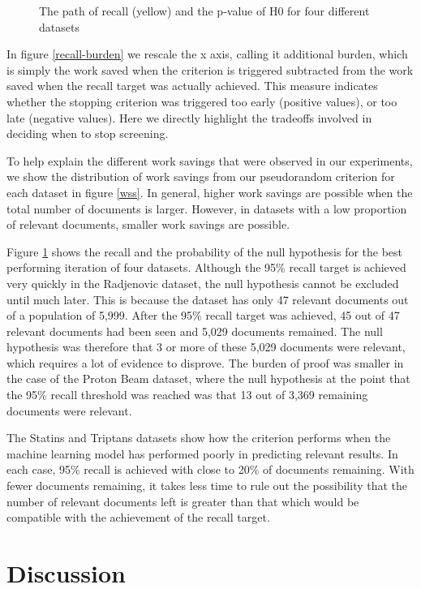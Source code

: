 \documentclass{bmcart}
\begin{document}
\begin{figure}
		\caption{\small The path of recall (yellow) and the p-value of H0 for four different datasets} 
		\label{H0paths}
	\end{figure}
	
	In figure \ref{recall-burden} we rescale the x axis, calling it additional burden, which is simply the work saved when the criterion is triggered subtracted from the work saved when the recall target was actually achieved. This measure indicates whether the stopping criterion was triggered too early (positive values), or too late (negative values). Here we directly highlight the tradeoffs involved in deciding when to stop screening. 
	
	To help explain the different work savings that were observed in our experiments, we show the distribution of work savings from our pseudorandom criterion for each dataset in figure \ref{wss}. In general, higher work savings are possible when the total number of documents is larger. However, in datasets with a low proportion of relevant documents, smaller work savings are possible. 
	
	Figure \ref{H0paths} shows the recall and the probability of the null hypothesis for the best performing iteration of four datasets. Although the 95\% recall target is achieved very quickly in the Radjenovic dataset, the null hypothesis cannot be excluded until much later. This is because the dataset has only 47 relevant documents out of a population of 5,999. After the 95\% recall target was achieved, 45 out of 47 relevant documents had been seen and 5,029 documents remained. The null hypothesis was therefore that 3 or more of these 5,029 documents were relevant, which requires a lot of evidence to disprove. The burden of proof was smaller in the case of the Proton Beam dataset, where the null hypothesis at the point that the 95\% recall threshold was reached was that 13 out of 3,369 remaining documents were relevant. 
	
	The Statins and Triptans datasets show how the criterion performs when the machine learning model has performed poorly in predicting relevant results. In each case, 95\% recall is achieved with close to 20\% of documents remaining. With fewer documents remaining, it takes less time to rule out the possibility that the number of relevant documents left is greater than that which would be compatible with the achievement of the recall target.
	
	\section*{Discussion}
	
\end{document}
